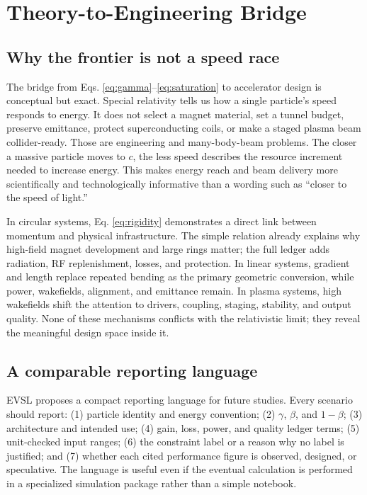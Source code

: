 \documentclass[conference]{../../../../Conference-LaTeX-template_10-17-19/IEEEtran}
\begin{document}
\section{Theory-to-Engineering Bridge}
\subsection{Why the frontier is not a speed race}
The bridge from Eqs. \eqref{eq:gamma}--\eqref{eq:saturation} to accelerator design is conceptual but exact. Special relativity tells us how a single particle's speed responds to energy. It does not select a magnet material, set a tunnel budget, preserve emittance, protect superconducting coils, or make a staged plasma beam collider-ready. Those are engineering and many-body-beam problems. The closer a massive particle moves to $c$, the less speed describes the resource increment needed to increase energy. This makes energy reach and beam delivery more scientifically and technologically informative than a wording such as ``closer to the speed of light.''

In circular systems, Eq. \eqref{eq:rigidity} demonstrates a direct link between momentum and physical infrastructure. The simple relation already explains why high-field magnet development and large rings matter; the full ledger adds radiation, RF replenishment, losses, and protection. In linear systems, gradient and length replace repeated bending as the primary geometric conversion, while power, wakefields, alignment, and emittance remain. In plasma systems, high wakefields shift the attention to drivers, coupling, staging, stability, and output quality. None of these mechanisms conflicts with the relativistic limit; they reveal the meaningful design space inside it.

\subsection{A comparable reporting language}
EVSL proposes a compact reporting language for future studies. Every scenario should report: (1) particle identity and energy convention; (2) $\gamma$, $\beta$, and $1-\beta$; (3) architecture and intended use; (4) gain, loss, power, and quality ledger terms; (5) unit-checked input ranges; (6) the constraint label or a reason why no label is justified; and (7) whether each cited performance figure is observed, designed, or speculative. The language is useful even if the eventual calculation is performed in a specialized simulation package rather than a simple notebook.
\end{document}
